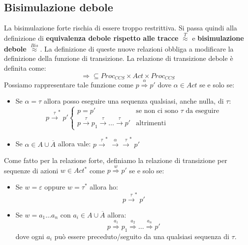 \subsection{Bisimulazione debole}
La bisimulazione forte rischia di essere troppo restrittiva. Si passa quindi alla
definizione di \textbf{equivalenza debole rispetto alle tracce} $\stackrel{T}{\approx}$
e \textbf{bisimulazione debole} $\stackrel{Bis}{\approx}$.
La definizione di queste nuove relazioni obbliga a modificare la definizione
della funzione di transizione. La relazione di transizione debole è definita come:
\begin{equation}
    \Rightarrow \subseteq Proc_{CCS} \times Act \times Proc_{CCS}
\end{equation}
Possiamo rappresentare tale funzione come $p \stackrel{\alpha}{\Rightarrow} p'$ dove
$\alpha \in Act$ se e solo se:
\begin{itemize}
    \item Se $\alpha = \tau$ allora posso eseguire una sequenza qualsiasi, anche
          nulla, di $\tau$:
          \begin{equation}
              p \xrightarrow{\tau}^{\ast} p'\begin{cases}
                  p = p'
                                        & \text{se non ci sono } \tau \text{ da eseguire} \\
                  p \xrightarrow{\tau} p_1 \xrightarrow{\tau} \dots
                  \xrightarrow{\tau} p' & \text{altrimenti}
              \end{cases}
          \end{equation}
    \item Se $\alpha \in A \cup \overline{A}$ allora vale:
          $p \xrightarrow{\tau}^{\ast} \xrightarrow{\alpha} \xrightarrow{\tau}^{\ast} p'$
\end{itemize}
Come fatto per la relazione forte, definiamo la relazione di transizione per
sequenze di azioni $w \in Act^{\ast}$ come $p \stackrel{w}{\Rightarrow} p'$ se e solo se:
\begin{itemize}
    \item Se $w = \varepsilon$ oppure $w = \tau^{\ast}$ allora ho:
          \begin{equation}
              p \xrightarrow{\tau}^{\ast} p'
          \end{equation}
    \item Se $w = a_1\dots a_n$ con $a_i \in A \cup \overline{A}$ allora:
          \begin{equation}
              p \stackrel{a_1}{\Rightarrow} p_1 \stackrel{a_2}{\Rightarrow} \dots
              \stackrel{a_n}{\Rightarrow} p'
          \end{equation}
          dove ogni $a_i$ può essere preceduto/seguito da una qualsiasi sequenza
          di $\tau$.
\end{itemize}
